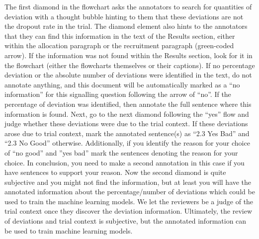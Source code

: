 \documentclass[sn-mathphys,Numbered]{sn-jnl}%
\begin{document}
The first diamond in the flowchart asks the annotators to search for quantities of deviation with a thought bubble hinting to them that these deviations are not the dropout rate in the trial.
The diamond element also hints to the annotators that they can find this information in the text of the Results section, either within the allocation paragraph or the recruitment paragraph (green-coded arrow).
If the information was not found within the Results section, look for it in the flowchart (either the flowcharts themselves or their captions).
If no percentage deviation or the absolute number of deviations were identified in the text, do not annotate anything, and this document will be automatically marked as a ``no information'' for this signalling question following the arrow of ``no''.
If the percentage of deviation was identified, then annotate the full sentence where this information is found.
Next, go to the next diamond following the ``yes'' flow and judge whether these deviations were due to the trial context.
If these deviations arose due to trial context, mark the annotated sentence(s) as ``2.3 Yes Bad'' and ``2.3 No Good'' otherwise.
Additionally, if you identify the reason for your choice of ``no good'' and ''yes bad'' mark the sentences denoting the reason for your choice.
In conclusion, you need to make a second annotation in this case if you have sentences to support your reason.
Now the second diamond is quite subjective and you might not find the information, but at least you will have the annotated information about the percentage/number of deviations which could be used to train the machine learning models.
We let the reviewers be a judge of the trial context once they discover the deviation information.
Ultimately, the review of deviations and trial context is subjective, but the annotated information can be used to train machine learning models.
%
%
%
\end{document}
